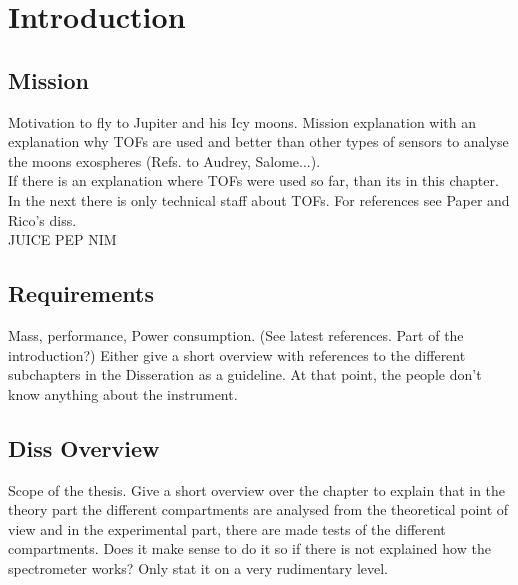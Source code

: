\section{Introduction}

	\subsection{Mission}
	Motivation to fly to Jupiter and his Icy moons. Mission explanation with an explanation why TOFs are used and better than other types of sensors to analyse the moons exospheres (Refs. to Audrey, Salome...).\\
	If there is an explanation where TOFs were used so far, than its in this chapter. In the next there is only technical staff about TOFs. For references see Paper and Rico's diss.\\
	JUICE PEP NIM
	
	\subsection{Requirements}
	Mass, performance, Power consumption. (See latest references. Part of the introduction?)
	Either give a short overview with references to the different subchapters in the Disseration as a guideline. At that point, the people don't know anything about the instrument.
	
	\subsection{Diss Overview} %
	Scope of the thesis. Give a short overview over the chapter to explain that in the theory part the different compartments are analysed from the theoretical point of view and in the experimental part, there are made tests of the different compartments. Does it make sense to do it so if there is not explained how the spectrometer works? Only stat it on a very rudimentary level.	
	
	\begin{comment}
	Planetology depends on simulations but there are also instruments needed to verify the models and set constrains for them. Optical techniques as ultraviolet (UV), visible (VIS), infrared (IR) spectroscopy. On space craft or on earth such as ALMA...
	laser ionization mass spectroscopy (LIMS) for lander to analyse the soil.
	Mass spectrometry has better sensitivity because there single atoms are counted 
	
	\end{comment}
		
	\begin{comment}
		Why a TOF compared to other types of mass spectrometers such as sector magnets or quadrupols.Costumisatoin to the needs of the of the mission (GC for NGMS).
		Improvement in the electronics.
	\end{comment}
	
	
	
	
	
	
	
	
	
	
	
	
	
	
	
	